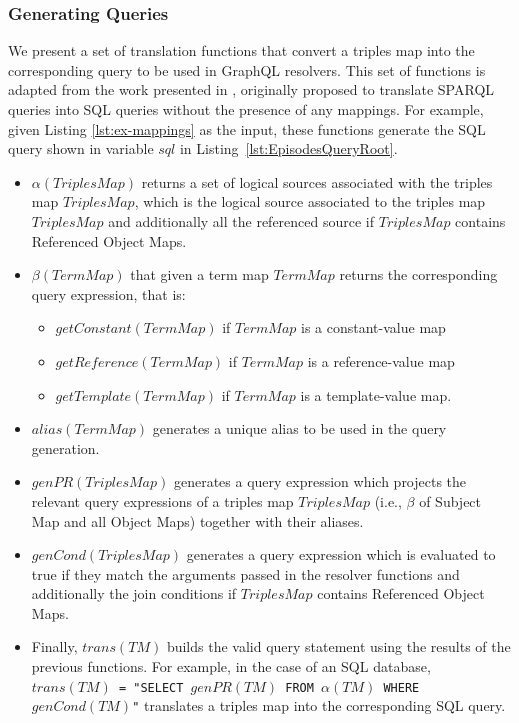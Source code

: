 \subsubsection{Generating Queries} 
We present a set of translation functions that convert a triples map into the corresponding query to be used in GraphQL resolvers. This set of functions is adapted from the work presented in \citep{chebotko2009semantics}, originally proposed to translate SPARQL queries into SQL queries without the presence of any mappings. For example, given Listing \ref{lst:ex-mappings} as the input, these functions generate the SQL query shown in variable $sql$ in Listing~\ref{lst:EpisodesQueryRoot}.
\begin{itemize}
    \item $\alpha(TriplesMap)$ returns a set of logical sources associated with the triples map $TriplesMap$, which is the logical source associated to the triples map $TriplesMap$ and additionally all the referenced source if $TriplesMap$ contains Referenced Object Maps.
    \item $\beta(TermMap)$ that given a term map $TermMap$ returns the corresponding query expression, that is: 
    \begin{itemize}
        \item $getConstant(TermMap)$ if $TermMap$ is a constant-value map
        \item $getReference(TermMap)$ if $TermMap$ is a reference-value map
        \item $getTemplate(TermMap)$ if $TermMap$ is a template-value map.
    \end{itemize}    
    \item $alias(TermMap)$ generates a unique alias to be used in the query generation.    
    \item $genPR(TriplesMap)$ generates a query expression which projects the relevant query expressions of a triples map $TriplesMap$ (i.e., $\beta$ of Subject Map and all Object Maps) together with their aliases.
    \item $genCond(TriplesMap)$ generates a query expression which is evaluated to true if they match the arguments passed in the resolver functions and additionally the join conditions if $TriplesMap$ contains Referenced Object Maps.
    \item Finally, $trans(TM)$ builds the valid query statement using the results of the previous functions. For example, in the case of an SQL database, \texttt{$trans(TM)$ = "SELECT $genPR(TM)$ FROM $\alpha(TM)$ WHERE $genCond(TM)$"} translates a triples map into the corresponding SQL query.
\end{itemize}

